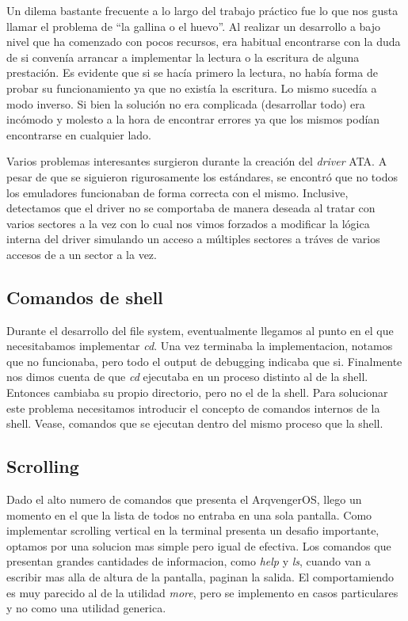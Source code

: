 \documentclass[a4paper,10pt]{article}
\begin{document}
Un dilema bastante frecuente a lo largo del trabajo práctico fue lo que nos gusta llamar el problema de ``la gallina o el huevo''. Al realizar
un desarrollo a bajo nivel que ha comenzado con pocos recursos, era habitual encontrarse con la duda de si convenía
arrancar a implementar la lectura o la escritura de alguna prestación. Es evidente que si se hacía primero la lectura, 
no había forma de probar su funcionamiento ya que no existía la escritura. Lo mismo sucedía a modo inverso. Si bien 
la solución no era complicada (desarrollar todo) era incómodo y molesto a la hora de encontrar errores ya que los mismos
podían encontrarse en cualquier lado.

Varios problemas interesantes surgieron durante la creación del \textit{driver} ATA. A pesar de que se siguieron
rigurosamente los estándares, se encontró que no todos los emuladores funcionaban de forma correcta con el mismo.
Inclusive, detectamos que el driver no se comportaba de manera deseada al tratar con varios sectores a la vez con lo
cual nos vimos forzados a modificar la lógica interna del driver simulando un acceso a múltiples sectores a tráves de
varios accesos de a un sector a la vez.


\subsection{Comandos de shell}
Durante el desarrollo del file system, eventualmente llegamos al punto en el que necesitabamos implementar \textit{cd}.
Una vez terminaba la implementacion, notamos que no funcionaba, pero todo el output de debugging indicaba que si.
Finalmente nos dimos cuenta de que \textit{cd} ejecutaba en un proceso distinto al de la shell.
Entonces cambiaba su propio directorio, pero no el de la shell.
Para solucionar este problema necesitamos introducir el concepto de comandos internos de la shell.
Vease, comandos que se ejecutan dentro del mismo proceso que la shell.

\subsection{Scrolling}
Dado el alto numero de comandos que presenta el ArqvengerOS, llego un momento en el que la lista de todos no entraba en una sola pantalla.
Como implementar scrolling vertical en la terminal presenta un desafio importante, optamos por una solucion mas simple pero igual de efectiva.
Los comandos que presentan grandes cantidades de informacion, como \textit{help} y \textit{ls}, cuando van a escribir mas alla de altura de la pantalla, paginan la salida.
El comportamiendo es muy parecido al de la utilidad \textit{more}, pero se implemento en casos particulares y no como una utilidad generica.
\end{document}
